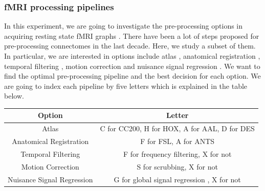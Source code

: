 \documentclass{article}
\begin{document}
\subsubsection{fMRI processing pipelines}
In this experiment, we are going to investigate the pre-processing options in acquiring resting state fMRI graphs \cite{huettel2004functional}. There have been a lot of steps proposed for pre-processing connectomes in the last decade. Here, we study a subset of them. In particular, we are interested in options include atlas \cite{mai2015atlas}, anatomical registration \cite{klein2009evaluation}, temporal filtering \cite{smith1999investigation}, motion correction \cite{power2012spurious} and nuisance signal regression \cite{fox2009global}. We want to find the optimal pre-processing pipeline and the best decision for each option. We are going to index each pipeline by five letters which is explained in the table below.   
\begin{center}
	\begin{tabular}{ |c|c| } 
		\hline
		Option & Letter  \\ \hline
		Atlas & C for CC200, H for HOX, A for AAL, D for DES \cite{craddock2012whole}\cite{desikan2006automated} \\ \hline
		Anatomical Registration & F for FSL, A for ANTS \cite{andersson2007non}\cite{avants2009advanced}\\ \hline
		Temporal Filtering & F for frequency filtering, X for not  \cite{smith1999investigation}\\ \hline
		Motion Correction & S for scrubbing, X for not  \cite{power2012spurious} \\ \hline
		Nuisance Signal Regression & G for global signal regression , X for not \cite{fox2009global} \\ \hline
	\end{tabular}
\end{center}
\end{document}
